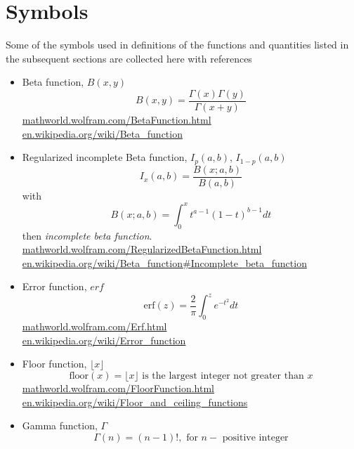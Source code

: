 \section{Symbols}
Some of the symbols used in definitions of the functions and quantities 
listed in the subsequent sections are collected here with references
\begin{itemize}
\item Beta function, $B(x,y)$\\
\begin{equation*}
B(x,y) = \frac{\Gamma(x)\Gamma(y)}{\Gamma(x+y)}
\end{equation*}
\url{mathworld.wolfram.com/BetaFunction.html}\\
\url{en.wikipedia.org/wiki/Beta_function}
\item Regularized incomplete Beta function,  $I_p(a,b)$, $I_{1-p}(a,b)$\\
\begin{equation*}
I_x(a,b) = \frac{B(x;a,b)}{B(a,b)}
\end{equation*}
with
\begin{equation*}
B(x;a,b) = \int_0^x t^{a-1} (1-t)^{b-1} dt
\end{equation*}
then \emph{incomplete beta function}.\\
\url{mathworld.wolfram.com/RegularizedBetaFunction.html}\\
\url{en.wikipedia.org/wiki/Beta_function#Incomplete_beta_function}
\item Error function, $erf$\\
\begin{equation*}
\text{erf}(z) = \frac{2}{\pi}\int_0^z e^{-t^2} dt
\end{equation*}
\url{mathworld.wolfram.com/Erf.html}\\
\url{en.wikipedia.org/wiki/Error_function}
\item Floor function, $\lfloor x \rfloor$\\
\begin{equation*}
\text{floor}(x) = \lfloor x\rfloor \text{ is the largest integer not greater than } x 
\end{equation*}
\url{mathworld.wolfram.com/FloorFunction.html}\\
\url{en.wikipedia.org/wiki/Floor_and_ceiling_functions}
\item Gamma function, $\Gamma$ \\
\begin{equation*}
\Gamma(n) = (n-1)!, \text{ for } n - \text{ positive integer}
\end{equation*}

\end{itemize}
